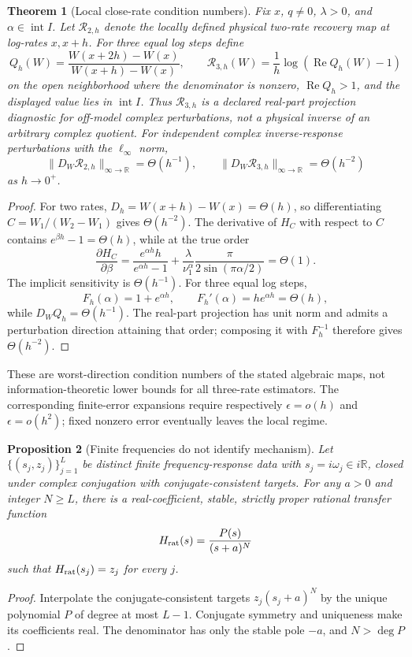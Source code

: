 \documentclass[11pt]{article}
\newtheorem{theorem}{Theorem}
\newtheorem{proposition}[theorem]{Proposition}
\theoremstyle{definition}
\theoremstyle{remark}
\newcommand{\R}{\mathbb R}
\begin{document}
\begin{theorem}[Local close-rate condition numbers]
\label{thm:conditioning}
Fix \(x\), \(q\ne0\), \(\lambda>0\), and
\(\alpha\in\operatorname{int}I\).  Let \(\mathcal R_{2,h}\) denote the
locally defined physical two-rate recovery map at log-rates \(x,x+h\).  For
three equal log steps define
\[
 Q_h(W)=\frac{W(x+2h)-W(x)}{W(x+h)-W(x)},\qquad
 \mathcal R_{3,h}(W)=\frac1h\log(\operatorname{Re}Q_h(W)-1)
\]
on the open neighborhood where the denominator is nonzero,
\(\operatorname{Re}Q_h>1\), and the displayed value lies in
\(\operatorname{int}I\).  Thus \(\mathcal R_{3,h}\) is a declared real-part
projection diagnostic for off-model complex perturbations, not a physical
inverse of an arbitrary complex quotient.  For independent complex inverse-response
perturbations with the \(\ell_\infty\) norm,
\[
 \|D_W\mathcal R_{2,h}\|_{\infty\to\R}=\Theta(h^{-1}),\qquad
 \|D_W\mathcal R_{3,h}\|_{\infty\to\R}=\Theta(h^{-2})
\]
as \(h\to0^+\).
\end{theorem}
\begin{proof}
For two rates, \(D_h=W(x+h)-W(x)=\Theta(h)\), so differentiating
\(C=W_1/(W_2-W_1)\) gives \(\Theta(h^{-2})\).  The derivative of \(H_C\)
with respect to \(C\) contains
\(e^{\beta h}-1=\Theta(h)\), while at the true order
\[
 \frac{\partial H_C}{\partial\beta}
 =\frac{e^{\alpha h}h}{e^{\alpha h}-1}
 +\frac{\lambda}{\nu_1^\alpha}
  \frac{\pi}{2\sin(\pi\alpha/2)}
 =\Theta(1).
\]
The implicit sensitivity is \(\Theta(h^{-1})\).  For three equal log steps,
\[
 F_h(\alpha)=1+e^{\alpha h},\qquad
 F_h'(\alpha)=he^{\alpha h}=\Theta(h),
\]
while \(D_WQ_h=\Theta(h^{-1})\).  The real-part projection has unit norm and
admits a perturbation direction attaining that order; composing it with
\(F_h^{-1}\) therefore gives \(\Theta(h^{-2})\).
\end{proof}

These are worst-direction condition numbers of the stated algebraic maps, not
information-theoretic lower bounds for all three-rate estimators.  The
corresponding finite-error expansions require respectively
\(\epsilon=o(h)\) and \(\epsilon=o(h^2)\); fixed nonzero error eventually
leaves the local regime.

\begin{proposition}[Finite frequencies do not identify mechanism]
\label{prop:rational-interpolant}
Let \(\{(s_j,z_j)\}_{j=1}^L\) be distinct finite frequency-response data with
\(s_j=i\omega_j\in i\R\), closed under complex conjugation with
conjugate-consistent targets.  For any
\(a>0\) and integer \(N\ge L\), there is a real-coefficient, stable, strictly
proper rational transfer function
\[
 H_{\rm rat}(s)=\frac{P(s)}{(s+a)^N}
\]
such that \(H_{\rm rat}(s_j)=z_j\) for every \(j\).
\end{proposition}
\begin{proof}
Interpolate the conjugate-consistent targets \(z_j(s_j+a)^N\) by the unique
polynomial \(P\) of degree at most \(L-1\).  Conjugate symmetry and uniqueness
make its coefficients real.  The denominator has only the stable pole
\(-a\), and \(N>\deg P\).
\end{proof}
\end{document}
